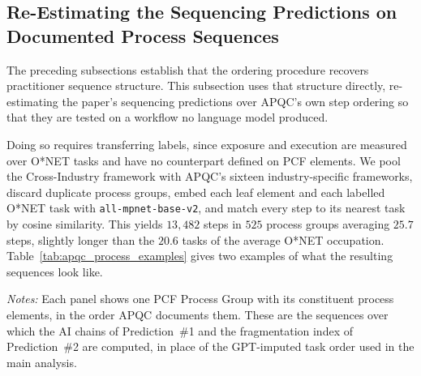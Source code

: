 \subsection{Re-Estimating the Sequencing Predictions on Documented Process Sequences}
\label{app:apqc_fragmentation}

The preceding subsections establish that the ordering procedure recovers practitioner sequence structure.
This subsection uses that structure directly, re-estimating the paper's sequencing predictions over APQC's own
step ordering so that they are tested on a workflow no language model produced.

Doing so requires transferring labels, since exposure and execution are measured over O*NET tasks and have no
counterpart defined on PCF elements.
We pool the Cross-Industry framework with APQC's sixteen industry-specific frameworks, discard duplicate
process groups, embed each leaf element and each labelled O*NET task with \texttt{all-mpnet-base-v2}, and
match every step to its nearest task by cosine similarity.
This yields $13{,}482$ steps in $525$ process groups averaging $25.7$ steps, slightly longer than the $20.6$
tasks of the average O*NET occupation.
Table~\ref{tab:apqc_process_examples} gives two examples of what the resulting sequences look like.


\begin{table}[h!]
    \caption{Example Process Groups From Two Industry Frameworks}
    \label{tab:apqc_process_examples}
    \begin{center}
    
    \end{center}
    \raggedright \footnotesize{\emph{Notes:}} Each panel shows one PCF Process Group with its constituent process elements, in the order APQC documents them.
    These are the sequences over which the AI chains of Prediction~\#1 and the fragmentation index of Prediction~\#2 are computed, in place of the GPT-imputed task order used in the main analysis.
\end{table}

